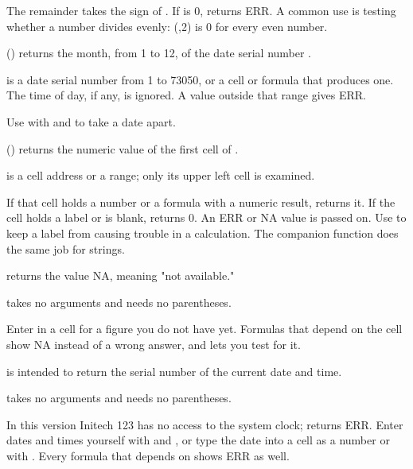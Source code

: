 The remainder takes the sign of . If  is 0,  returns ERR. A common use is testing whether a number divides evenly: (,2) is 0 for every even number.

\Examples
{}

() returns the month, from 1 to 12, of the date serial number .

 is a date serial number from 1 to 73050, or a cell or formula that produces one. The time of day, if any, is ignored. A value outside that range gives ERR.

Use  with  and  to take a date apart.

\Examples
{}

() returns the numeric value of the first cell of .

 is a cell address or a range; only its upper left cell is examined.

If that cell holds a number or a formula with a numeric result,  returns it. If the cell holds a label or is blank,  returns 0. An ERR or NA value is passed on. Use  to keep a label from causing trouble in a calculation. The companion function  does the same job for strings.

\Examples
{}

 returns the value NA, meaning "not available."

 takes no arguments and needs no parentheses.

Enter  in a cell for a figure you do not have yet. Formulas that depend on the cell show NA instead of a wrong answer, and  lets you test for it.

\Examples
{}

 is intended to return the serial number of the current date and time.

 takes no arguments and needs no parentheses.

In this version Initech 123 has no access to the system clock;  returns ERR. Enter dates and times yourself with  and , or type the date into a cell as a number or with . Every formula that depends on  shows ERR as well.

\Examples
{}

